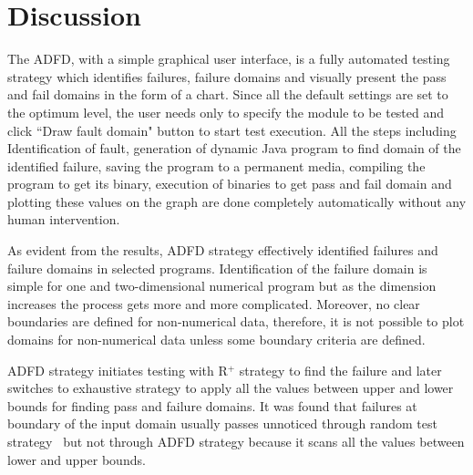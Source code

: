 



\section{Discussion} \label{sec:discussion4}

The ADFD, with a simple graphical user interface, is a fully automated testing strategy which identifies failures, failure domains and visually present the pass and fail domains in the form of a chart. Since all the default settings are set to the optimum level, the user needs only to specify the module to be tested and click ``Draw fault domain" button to start test execution. All the steps including Identification of fault, generation of dynamic Java program to find domain of the identified failure, saving the program to a permanent media, compiling the program to get its binary, execution of binaries to get pass and fail domain and plotting these values on the graph are done completely automatically without any human intervention.

As evident from the results, ADFD strategy effectively identified failures and failure domains in selected programs. Identification of the failure domain is simple for one and two-dimensional numerical program but as the dimension increases the process gets more and more complicated. Moreover, no clear boundaries are defined for non-numerical data, therefore, it is not possible to plot domains for non-numerical data unless some boundary criteria are defined.

ADFD strategy initiates testing with R$^+$ strategy to find the failure and later switches to exhaustive strategy to apply all the values between upper and lower bounds for finding pass and failure domains. It was found that failures at boundary of the input domain usually passes unnoticed through random test strategy~\cite{reid1997empirical} but not through ADFD strategy because it scans all the values between lower and upper bounds.


